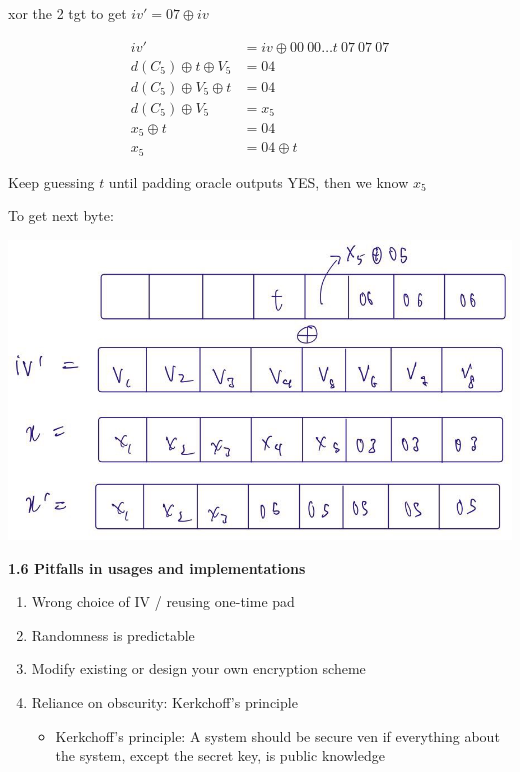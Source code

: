 \documentclass[landscape,a4paper]{extarticle}
\newenvironment{Figure}
  {\par\noindent\minipage{\linewidth}}
  {\endminipage\par\medskip}
\begin{document}
\begin{multicols*}{5}
    xor the 2 tgt to get $iv' = 07 \oplus iv$

    \begin{align*}
        iv' &= iv \oplus 00\ 00 \ldots t\ 07\ 07\ 07\\
        d(C_5) \oplus t \oplus V_5 &= 04\\
        d(C_5) \oplus V_5 \oplus t &= 04\\
        d(C_5) \oplus V_5 &= x_5\\
        x_5 \oplus t &= 04\\
        x_5 &= 04 \oplus t
    \end{align*}
    
    Keep guessing $t$ until padding oracle outputs YES, then we know $x_5$

    To get next byte:
    \begin{Figure}
        \centering
        \includegraphics[width=\linewidth]{padding_oracle_next_byte.jpg}
    \end{Figure} 

    \textbf{1.6 Pitfalls in usages and implementations}
    \begin{enumerate}
        \item Wrong choice of IV / reusing one-time pad
        \item Randomness is predictable
        \item Modify existing or design your own encryption scheme
        \item Reliance on obscurity: Kerkchoff's principle
        \begin{itemize}
            \item Kerkchoff's principle: A system should be secure ven if everything about the
            system, except the secret key, is public knowledge
        \end{itemize}
    \end{enumerate}

\end{multicols*}
\end{document}
